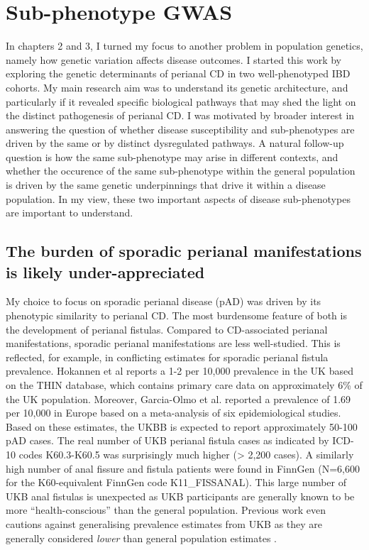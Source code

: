 \section{Sub-phenotype GWAS}
In chapters 2 and 3, I turned my focus to another problem in population genetics, namely how genetic variation affects disease outcomes. I started this work by exploring the genetic determinants of perianal CD in two well-phenotyped IBD cohorts. My main research aim was to understand its genetic architecture, and particularly if it revealed specific biological pathways that may shed the light on the distinct pathogenesis of perianal CD. I was motivated by broader interest in answering the question of whether disease susceptibility and sub-phenotypes are driven by the same or by distinct dysregulated pathways. A natural follow-up question is how the same sub-phenotype may arise in different contexts, and whether the occurence of the same sub-phenotype within the general population is driven by the same genetic underpinnings that drive it within a disease population. In my view, these two important aspects of disease sub-phenotypes are important to understand.  


\subsection{The burden of sporadic perianal manifestations is likely under-appreciated}
My choice to focus on sporadic perianal disease (pAD) was driven by its phenotypic similarity to perianal CD. The most burdensome feature of both is the development of perianal fistulas. Compared to CD-associated perianal manifestations, sporadic perianal manifestations are less well-studied. This is reflected, for example, in conflicting estimates for sporadic perianal fistula prevalence. Hokannen et al \cite{Hokkanen2019-ov} reports a 1-2 per 10,000 prevalence in the UK based on the THIN database, which contains primary care data on approximately 6\% of the UK population. Moreover, Garcia-Olmo et al. \cite{Garcia-Olmo2019-ql} reported a prevalence of 1.69 per 10,000 in Europe based on a meta-analysis of six epidemiological studies. Based on these estimates, the UKBB is expected to report approximately 50-100 pAD cases. The real number of UKB perianal fistula cases as indicated by ICD-10 codes K60.3-K60.5 was surprisingly much higher (> 2,200 cases). A similarly high number of anal fissure and fistula patients were found in FinnGen (N=6,600 for the K60-equivalent FinnGen code K11\_FISSANAL). This large number of UKB anal fistulas is unexpected as UKB participants are generally known to be more “health-conscious” than the general population. Previous work even cautions against generalising prevalence estimates from UKB as they are generally considered \textit{lower} than general population estimates \cite{Fry2017-ug}. \\

